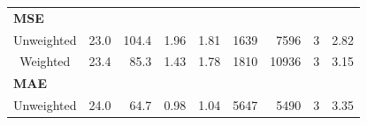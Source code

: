 {\begin{landscape}
\begin{table}[]
\begin{tabular}{crrrrrrrr}
\multicolumn{9}{l}{\textbf{MSE}}  \\
Unweighted   & 23.0   & 104.4     & 1.96      & 1.81      & 1639                                                                                      & 7596                                                                                               & 3                                                                                       & 2.82                                                                                   \\
Weighted                                                                                                   & 23.4                                                                                   & 85.3                                                                                        & 1.43                                                                            & 1.78                                                                                          & 1810                                                                                      & 10936                                                                                              & 3                                                                                       & 3.15                                                                                   \\ \hline
\multicolumn{9}{l}{\textbf{MAE}}                                                                                                                                                                                                                                                                                                                                                                                                                                                                                                                                                                                                                                                                                                                                                                                                                                                 \\
Unweighted                                                                                                 & 24.0                                                                                   & 64.7                                                                                        & 0.98                                                                            & 1.04                                                                                          & 5647                                                                                      & 5490                                                                                               & 3                                                                                       & 3.35                                                                                   \\

\end{tabular}
\end{table}
\end{landscape}}
